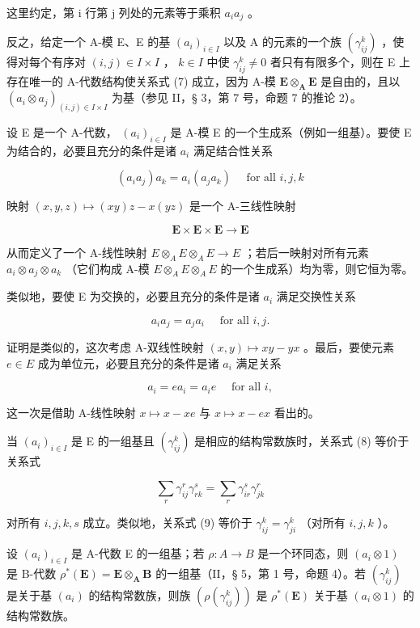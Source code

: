 这里约定，第 i 行第 j 列处的元素等于乘积 \(a_{i}a_{j}\) 。

反之，给定一个 A-模 E、E 的基 \((a_{i})_{i\in I}\) 以及 A 的元素的一个族 \((\gamma_{ij}^{k})\) ，使得对每个有序对 \((i,j)\in I\times I\) ， \(k\in I\) 中使 \(\gamma_{ij}^{k}\neq 0\) 者只有有限多个，则在 E 上存在唯一的 A-代数结构使关系式 (7) 成立，因为 A-模 \(\mathbf{E}\otimes_{\mathbf{A}}\mathbf{E}\) 是自由的，且以 \((a_{i}\otimes a_{j})_{(i,j)\in I\times I}\) 为基（参见 II，§ 3，第 7 号，命题 7 的推论 2）。

设 E 是一个 A-代数， \((a_{i})_{i\in I}\) 是 A-模 E 的一个生成系（例如一组基）。要使 E 为结合的，必要且充分的条件是诸 \(a_{i}\) 满足结合性关系

\[
(a _ {i} a _ {j}) a _ {k} = a _ {i} (a _ {j} a _ {k}) \quad \text { for   all } i, j, k\tag{8}
\]

映射 \((x, y, z) \mapsto (xy)z - x(yz)\) 是一个 A-三线性映射

\[
\mathbf {E} \times \mathbf {E} \times \mathbf {E} \rightarrow \mathbf {E}
\]

从而定义了一个 A-线性映射 \(E \otimes_{A} E \otimes_{A} E \to E\) ；若后一映射对所有元素 \(a_{i} \otimes a_{j} \otimes a_{k}\) （它们构成 A-模 \(E \otimes_{A} E \otimes_{A} E\) 的一个生成系）均为零，则它恒为零。

类似地，要使 E 为交换的，必要且充分的条件是诸 \(a_{i}\) 满足交换性关系

\[
a _ {i} a _ {j} = a _ {j} a _ {i} \quad \text { for   all } i, j.\tag{9}
\]

证明是类似的，这次考虑 A-双线性映射 \((x,y)\mapsto xy - yx\) 。最后，要使元素 \(e\in E\) 成为单位元，必要且充分的条件是诸 \(a_{i}\) 满足关系

\[
a _ {i} = e a _ {i} = a _ {i} e \quad \text { for   all } i,\tag{10}
\]

这一次是借助 A-线性映射 \(x \mapsto x - xe\) 与 \(x \mapsto x - ex\) 看出的。

当 \((a_{i})_{i\in I}\) 是 E 的一组基且 \((\gamma_{ij}^{k})\) 是相应的结构常数族时，关系式 (8) 等价于关系式

\[
\sum_ {r} \gamma_ {i j} ^ {r} \gamma_ {r k} ^ {s} = \sum_ {r} \gamma_ {i r} ^ {s} \gamma_ {j k} ^ {r}
\]

对所有 \(i, j, k, s\) 成立。类似地，关系式 (9) 等价于 \(\gamma_{ij}^{k} = \gamma_{ji}^{k}\) （对所有 \(i, j, k\) ）。

设 \((a_{i})_{i\in I}\) 是 A-代数 E 的一组基；若 \(\rho :A\to B\) 是一个环同态，则 \((a_{i}\otimes 1)\) 是 B-代数 \(\rho^{*}(\mathbf{E}) = \mathbf{E}\otimes_{\mathbf{A}}\mathbf{B}\) 的一组基（II，§ 5，第 1 号，命题 4）。若 \((\gamma_{ij}^{k})\) 是关于基 \((a_{i})\) 的结构常数族，则族 \((\rho (\gamma_{ij}^{k}))\) 是 \(\rho^{*}(\mathbf{E})\) 关于基 \((a_{i}\otimes 1)\) 的结构常数族。

